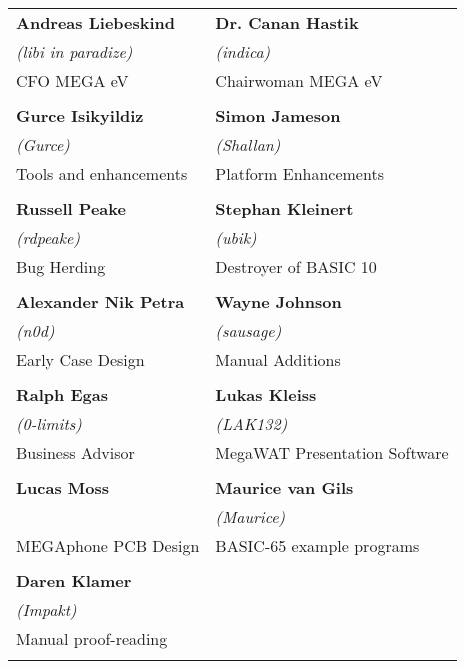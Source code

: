 \setlength{\tabcolsep}{1mm}
\begin{tabular}{p{6cm}p{6cm}}

{\large\bf Andreas Liebeskind}     & {\large\bf Dr. Canan Hastik} \\
 \textit{(libi in paradize)}       & \textit{(indica)} \\
CFO MEGA eV                        & Chairwoman MEGA eV \\
& \\
{\large\bf Gurce Isikyildiz}       & {\large\bf Simon Jameson} \\
 \textit{(Gurce)}                  &  \textit{(Shallan)} \\
Tools and enhancements             & Platform Enhancements \\
& \\
{\large\bf Russell Peake}          & {\large\bf Stephan Kleinert} \\
  \textit{(rdpeake)}               & \textit{(ubik)}        \\
Bug Herding                        & Destroyer of BASIC 10     \\
& \\
{\large\bf Alexander Nik Petra}    & {\large\bf Wayne Johnson} \\
 \textit{(n0d)}                    &  \textit{(sausage)} \\
Early Case Design                  & Manual Additions \\
& \\
{\large\bf Ralph Egas}             & {\large\bf Lukas Kleiss} \\
 \textit{(0-limits)}               & \textit{(LAK132)} \\
Business Advisor                   & MegaWAT Presentation Software \\
& \\
{\large\bf Lucas Moss}             & {\large\bf Maurice van Gils }  \\
                                   & \textit{(Maurice)}  \\
MEGAphone PCB Design               & BASIC-65 example programs \\
& \\
{\large\bf Daren Klamer}           \\
 \textit{(Impakt)}                 \\
Manual proof-reading               \\
& \\
\end{tabular}

